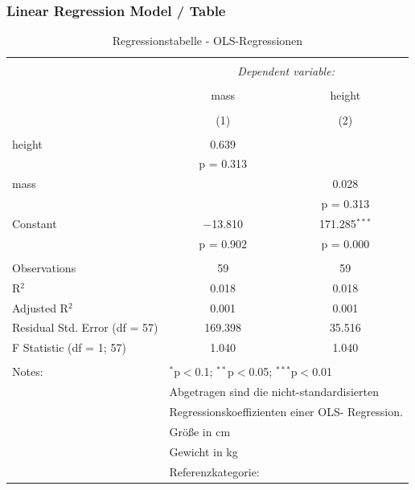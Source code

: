 \documentclass[
  12pt,
]{article}
\begin{document}
\hypertarget{linear-regression-model-table}{%
\subsubsection{Linear Regression Model /
Table}\label{linear-regression-model-table}}

\begin{table}[!htbp] \centering 
  \caption{Regressionstabelle - OLS-Regressionen} 
  \label{tab:linreg1} 
\begin{tabular}{@{\extracolsep{5pt}}lcc} 
\\[-1.8ex]\hline 
\hline \\[-1.8ex] 
 & \multicolumn{2}{c}{\textit{Dependent variable:}} \\ 
\cline{2-3} 
\\[-1.8ex] & mass & height \\ 
\\[-1.8ex] & (1) & (2)\\ 
\hline \\[-1.8ex] 
 height & 0.639 &  \\ 
  & p = 0.313 &  \\ 
  mass &  & 0.028 \\ 
  &  & p = 0.313 \\ 
  Constant & $-$13.810 & 171.285$^{***}$ \\ 
  & p = 0.902 & p = 0.000 \\ 
 \hline \\[-1.8ex] 
Observations & 59 & 59 \\ 
R$^{2}$ & 0.018 & 0.018 \\ 
Adjusted R$^{2}$ & 0.001 & 0.001 \\ 
Residual Std. Error (df = 57) & 169.398 & 35.516 \\ 
F Statistic (df = 1; 57) & 1.040 & 1.040 \\ 
\hline 
\hline \\[-1.8ex] 
Notes: & \multicolumn{2}{l}{$^{*}$p$<$0.1; $^{**}$p$<$0.05; $^{***}$p$<$0.01} \\ 
 & \multicolumn{2}{l}{Abgetragen sind die nicht-standardisierten} \\ 
 & \multicolumn{2}{l}{Regressionskoeffizienten einer OLS- Regression.} \\ 
 & \multicolumn{2}{l}{Größe in cm} \\ 
 & \multicolumn{2}{l}{Gewicht in kg} \\ 
 & \multicolumn{2}{l}{Referenzkategorie:} \\ 
\end{tabular} 
\end{table}
\end{document}
